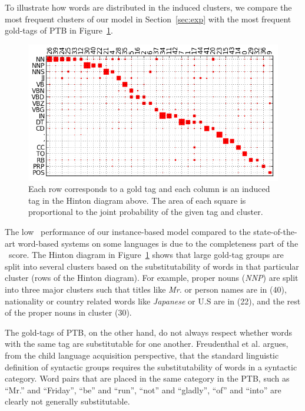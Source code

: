 To illustrate how words are distributed in the induced clusters, we
compare the most frequent clusters of our model in Section~\ref{sec:exp}
with the most frequent gold-tags of PTB in Figure~\ref{plot-hinton}.  
\begin{figure}[t] \centering
\includegraphics[width=1\columnwidth]{hinton.png}
\caption{Each row corresponds to a gold tag and each column is an
  induced tag in the Hinton diagram above.  The area of each square is
  proportional to the joint probability of the given tag and cluster.
}
  \label{plot-hinton}
\end{figure}

The low \vm\ performance of our instance-based model compared to the
state-of-the-art word-based systems on some languages is due to the
completeness part of the \vm\ score.  The Hinton diagram in
Figure~\ref{plot-hinton} shows that large gold-tag groups are split
into several clusters based on the substitutability of words in that
particular cluster (rows of the Hinton diagram).  For example, proper
nouns ({\em NNP}) are split into three major clusters such that titles
like {\em Mr.} or person names are in (40), nationality or country
related words like {\em Japanese} or {U.S} are in (22), and the rest
of the proper nouns in cluster (30).

The gold-tags of PTB, on the other hand, do not always respect whether
words with the same tag are substitutable for one another.
Freudenthal et al.   argues, from
the child language acquisition perspective, that the standard
linguistic definition of syntactic groups requires the
substitutability of words in a syntactic category.  Word pairs that
are placed in the same category in the PTB, such as ``Mr.'' and
``Friday'', ``be'' and ``run'', ``not'' and ``gladly'', ``of'' and
``into'' are clearly not generally substitutable.


